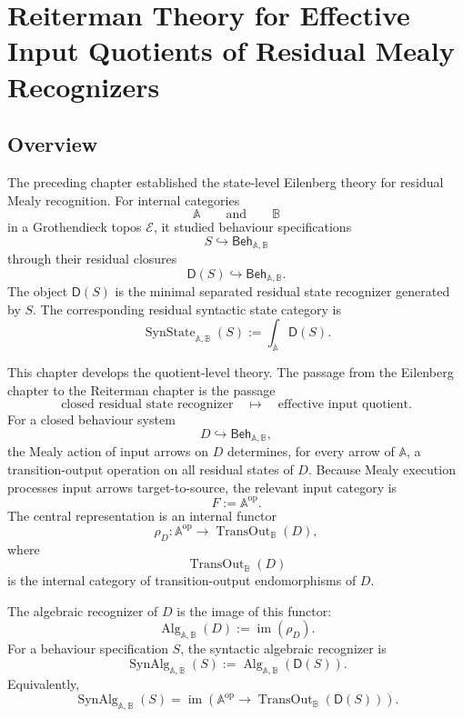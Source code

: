 \chapter{Reiterman Theory for Effective Input Quotients of Residual Mealy Recognizers}
\label{ch:reiterman-effective-input-quotients-residual-mealy}

\section{Overview}
\label{sec:reiterman-overview}

The preceding chapter established the state-level Eilenberg theory for
residual Mealy recognition. For internal categories
\[
\mathbb A
\qquad\text{and}\qquad
\mathbb B
\]
in a Grothendieck topos \(\mathcal E\), it studied behaviour specifications
\[
S\hookrightarrow \mathsf{Beh}_{\mathbb A,\mathbb B}
\]
through their residual closures
\[
\mathsf D(S)\hookrightarrow \mathsf{Beh}_{\mathbb A,\mathbb B}.
\]
The object \(\mathsf D(S)\) is the minimal separated residual state recognizer
generated by \(S\). The corresponding residual syntactic state category is
\[
\operatorname{SynState}_{\mathbb A,\mathbb B}(S)
:=
\int_{\mathbb A}\mathsf D(S).
\]

This chapter develops the quotient-level theory. The passage from the
Eilenberg chapter to the Reiterman chapter is the passage
\[
\text{closed residual state recognizer}
\quad\longmapsto\quad
\text{effective input quotient}.
\]
For a closed behaviour system
\[
D\hookrightarrow\mathsf{Beh}_{\mathbb A,\mathbb B},
\]
the Mealy action of input arrows on \(D\) determines, for every arrow of
\(\mathbb A\), a transition-output operation on all residual states of \(D\).
Because Mealy execution processes input arrows target-to-source, the relevant
input category is
\[
F:=\mathbb A^{\mathrm{op}}.
\]
The central representation is an internal functor
\[
\rho_D:
\mathbb A^{\mathrm{op}}
\longrightarrow
\operatorname{TransOut}_{\mathbb B}(D),
\]
where
\[
\operatorname{TransOut}_{\mathbb B}(D)
\]
is the internal category of transition-output endomorphisms of \(D\).

The algebraic recognizer of \(D\) is the image of this functor:
\[
\operatorname{Alg}_{\mathbb A,\mathbb B}(D)
:=
\operatorname{im}(\rho_D).
\]
For a behaviour specification \(S\), the syntactic algebraic recognizer is
\[
\operatorname{SynAlg}_{\mathbb A,\mathbb B}(S)
:=
\operatorname{Alg}_{\mathbb A,\mathbb B}(\mathsf D(S)).
\]
Equivalently,
\[
\operatorname{SynAlg}_{\mathbb A,\mathbb B}(S)
=
\operatorname{im}
\left(
\mathbb A^{\mathrm{op}}
\to
\operatorname{TransOut}_{\mathbb B}(\mathsf D(S))
\right).
\]

